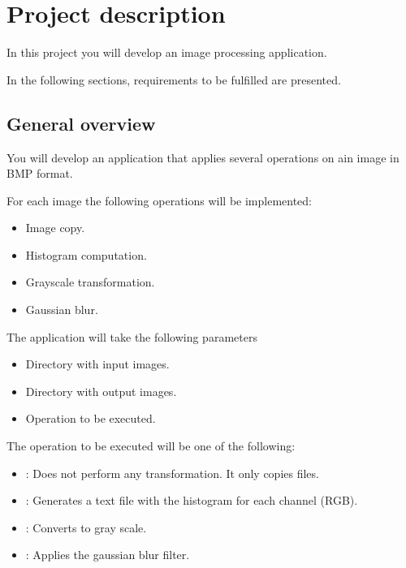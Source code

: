 \section{Project description}

In this project you will develop an image processing application.

In the following sections, requirements to be fulfilled are presented.

\subsection{General overview}

You will develop an application that applies several operations
on ain image in BMP format.

For each image the following operations will be implemented:

\begin{itemize}
\item Image copy.
\item Histogram computation.
\item Grayscale transformation.
\item Gaussian blur.
\end{itemize}

The application will take the following parameters

\begin{itemize}

\item Directory with input images.
\item Directory with output images.
\item Operation to be executed.

\end{itemize}

The operation to be executed will be one of the following:

\begin{itemize}

\item {}: 
Does not perform any transformation. It only copies files.

\item {}: 
Generates a text file with the histogram for each channel (RGB).

\item {}: 
Converts to gray scale.

\item {}: 
Applies the gaussian blur filter.

\end{itemize}

